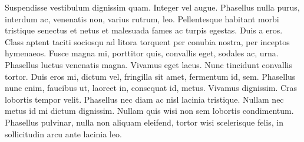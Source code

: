 Suspendisse vestibulum dignissim quam. Integer vel augue. Phasellus nulla purus, interdum ac, venenatis non, varius rutrum, leo. Pellentesque habitant morbi tristique senectus et netus et malesuada fames ac turpis egestas. Duis a eros. Class aptent taciti sociosqu ad litora torquent per conubia nostra, per inceptos hymenaeos. Fusce magna mi, porttitor quis, convallis eget, sodales ac, urna. Phasellus luctus venenatis magna. Vivamus eget lacus. Nunc tincidunt convallis tortor. Duis eros mi, dictum vel, fringilla sit amet, fermentum id, sem. Phasellus nunc enim, faucibus ut, laoreet in, consequat id, metus. Vivamus dignissim. Cras lobortis tempor velit. Phasellus nec diam ac nisl lacinia tristique. Nullam nec metus id mi dictum dignissim. Nullam quis wisi non sem lobortis condimentum. Phasellus pulvinar, nulla non aliquam eleifend, tortor wisi scelerisque felis, in sollicitudin arcu ante lacinia leo.
